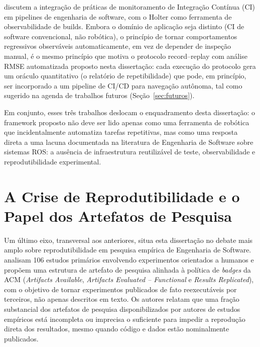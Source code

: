  discutem a integração de práticas de monitoramento de
Integração Contínua (CI) em pipelines de engenharia de software, com o Holter
como ferramenta de observabilidade de builds. Embora o domínio de aplicação seja
distinto (CI de software convencional, não robótica), o princípio de tornar
comportamentos regressivos observáveis automaticamente, em vez de depender de
inspeção manual, é o mesmo princípio que motiva o protocolo record--replay com
análise RMSE automatizada proposto nesta dissertação: cada execução do protocolo
gera um oráculo quantitativo (o relatório de repetibilidade) que pode, em
princípio, ser incorporado a um pipeline de CI/CD para navegação autônoma, tal
como sugerido na agenda de trabalhos futuros (Seção~\ref{sec:futuros}).

Em conjunto, esses três trabalhos deslocam o enquadramento desta dissertação: o
framework proposto não deve ser lido apenas como uma ferramenta de robótica que
incidentalmente automatiza tarefas repetitivas, mas como uma resposta direta a uma
lacuna documentada na literatura de Engenharia de Software sobre sistemas ROS:
a ausência de infraestrutura reutilizável de teste, observabilidade e
reprodutibilidade experimental.


\section{A Crise de Reprodutibilidade e o Papel dos Artefatos de Pesquisa}
\label{sec:rel_reprodutibilidade}

Um último eixo, transversal aos anteriores, situa esta dissertação no debate mais
amplo sobre reprodutibilidade em pesquisa empírica de Engenharia de Software.
 analisam 106 estudos primários envolvendo experimentos
orientados a humanos e propõem uma estrutura de artefato de pesquisa alinhada à
política de \textit{badges} da ACM (\textit{Artifacts Available},
\textit{Artifacts Evaluated -- Functional} e \textit{Results Replicated}), com o
objetivo de tornar experimentos publicados de fato reexecutáveis por terceiros,
não apenas descritos em texto. Os autores relatam que uma fração substancial dos
artefatos de pesquisa disponibilizados por autores de estudos empíricos está
incompleta ou imprecisa o suficiente para impedir a reprodução direta dos
resultados, mesmo quando código e dados estão nominalmente publicados.

